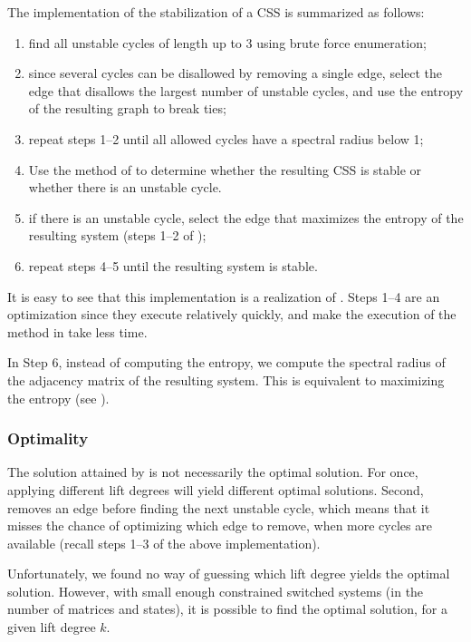 \documentclass[11pt,twoside,a4paper,openright]{uclouvain-thesis}
\begin{document}
The implementation of the stabilization of a CSS is summarized as follows:
\begin{enumerate}
\item find all unstable cycles of length up to 3 using brute force enumeration;
\item since several cycles can be disallowed by removing a single edge, select the edge that disallows the largest number of unstable cycles, and use the entropy of the resulting graph to break ties;
\item repeat steps 1--2 until all allowed cycles have a spectral radius below 1;
\item Use the method of \cite{legat2017certifying} to determine whether the resulting CSS is stable or whether there is an unstable cycle.
\item if there is an unstable cycle, select the edge that maximizes the entropy of the resulting system  (steps 1--2 of );
\item repeat steps 4--5 until the resulting system is stable.
\end{enumerate}

It is easy to see that this implementation is a realization of .
Steps 1--4 are an optimization since they execute relatively quickly, and make the execution of the method in \cite{legat2017certifying} take less time.

In Step 6, instead of computing the entropy, we compute the spectral radius of the adjacency matrix of the resulting system.
This is equivalent to maximizing the entropy (see ).

\subsubsection{Optimality}
\label{sec:optimality}

The solution attained by  is not necessarily the optimal solution.
For once, applying different lift degrees will yield different optimal solutions.
Second,  removes an edge before finding the next unstable cycle, which means that it misses the chance of optimizing which edge to remove, when more cycles are available (recall steps 1--3 of the above implementation).

Unfortunately, we found no way of guessing which lift degree yields the optimal solution.
However, with small enough constrained switched systems (in the number of matrices and states), it is possible to find the optimal solution, for a given lift degree $k$.
\end{document}
